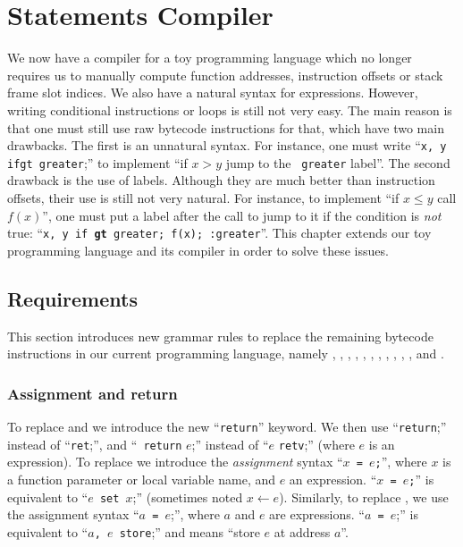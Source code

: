 
\renewcommand{\rustfile}{chapter6}
\setcounter{rustid}{0}


\chapter{Statements Compiler}\label{chapter:statements-compiler}

We now have a compiler for a toy programming language which no longer requires
us to manually compute function addresses, instruction offsets or stack frame
slot indices. We also have a natural syntax for expressions. However, writing
conditional instructions or loops is still not very easy. The main reason is
that one must still use raw bytecode instructions for that, which have two main
drawbacks. The first is an unnatural syntax. For instance, one must write
``{\tt x, y ifgt greater};'' to implement ``if $x > y$ jump to the {\tt
greater} label''. The second drawback is the use of labels. Although they are
much better than instruction offsets, their use is still not very natural. For
instance, to implement ``if $x \le y$ call $f(x)$'', one must put a label after
the call to jump to it if the condition is {\em not} true: ``{\tt x, y if{\bf
gt} greater; f(x); :greater}''. This chapter extends our toy programming
language and its compiler in order to solve these issues.

\section{Requirements}

This section introduces new grammar rules to replace the remaining bytecode
instructions in our current programming language, namely ,
, , , , , ,
, , , , and .

\subsection{Assignment and return}

To replace  and  we introduce the new ``{\tt return}''
keyword. We then use ``{\tt return};'' instead of ``{\tt ret};'', and ``{\tt
return} $e$;'' instead of ``$e$ {\tt retv};'' (where $e$ is an expression). To
replace  we introduce the {\em assignment} syntax ``{\tt $x$ =
$e$;}'', where $x$ is a function parameter or local variable name, and $e$ an
expression. ``{\tt $x$ = $e$;}'' is equivalent to ``{\tt $e$ set $x$};''
(sometimes noted $x \leftarrow e$). Similarly, to replace , we use
the assignment syntax ``{\tt *$a$ = $e$};'', where $a$ and $e$ are expressions.
``{\tt *$a$ = $e$};'' is equivalent to ``{\tt $a$, $e$ store};'' and means
``store $e$ at address $a$''.

